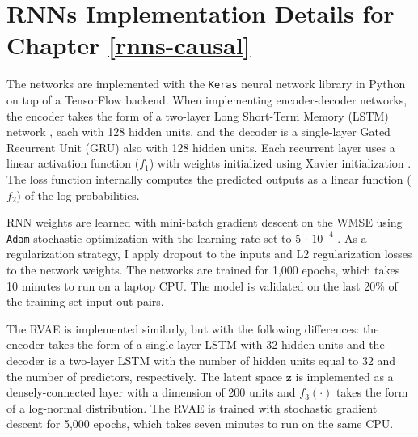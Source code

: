\chapter{RNNs Implementation Details for Chapter \ref{rnns-causal}} \label{imp}

The networks are implemented with the \texttt{Keras} neural network library \citep{chollet2015keras} in Python on top of a TensorFlow backend. When implementing encoder-decoder networks, the encoder takes the form of a two-layer Long Short-Term Memory (LSTM) network \citep{schmidhuber1997long}, each with 128 hidden units, and the decoder is a single-layer Gated Recurrent Unit (GRU) \citep{chung2014} also with 128 hidden units. Each recurrent layer uses a linear activation function ($f_1$) with weights initialized using Xavier initialization \citep{glorot2010}. The loss function internally computes the predicted outputs as a linear function ($f_2$) of the log probabilities. 

RNN weights are learned with mini-batch gradient descent on the WMSE using \texttt{Adam} stochastic optimization with the learning rate set to $5\,\cdot\,10^{-4}$ \citep{kingma2014adam}. As a regularization strategy, I apply dropout to the inputs and L2 regularization losses to the network weights. The networks are trained for 1,000 epochs, which takes 10 minutes to run on a laptop CPU. The model is validated on the last 20\% of the training set input-out pairs.  

The RVAE is implemented similarly, but with the following differences: the encoder takes the form of a single-layer LSTM with 32 hidden units and the decoder is a two-layer LSTM with the number of hidden units equal to 32 and the number of predictors, respectively. The latent space $\boldsymbol{z}$ is implemented as a densely-connected layer with a dimension of 200 units and $f_3(\cdot)$ takes the form of a log-normal distribution. The RVAE is trained with stochastic gradient descent for 5,000 epochs, which takes seven minutes to run on the same CPU.